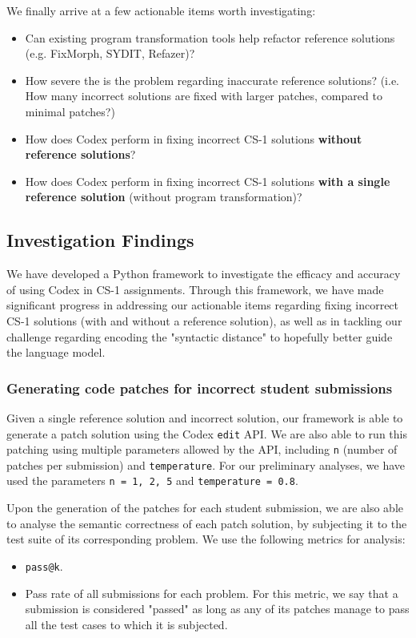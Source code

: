 We finally arrive at a few actionable items worth investigating:
\begin{itemize}
    \item Can existing program transformation tools help refactor reference solutions
          (e.g. FixMorph, SYDIT, Refazer)?
    \item How severe the is the problem regarding inaccurate reference solutions?
          (i.e. How many incorrect solutions are fixed with larger patches, compared
           to minimal patches?)
    \item How does Codex perform in fixing incorrect CS-1 solutions \textbf{without reference solutions}?
    \item How does Codex perform in fixing incorrect CS-1 solutions \textbf{with a single reference
          solution} (without program transformation)?
\end{itemize}

\subsection{Investigation Findings}

We have developed a Python framework to investigate the efficacy and accuracy of using Codex in
CS-1 assignments.
Through this framework, we have made significant progress in addressing our actionable items regarding
fixing incorrect CS-1 solutions (with and without a reference solution), as well as in tackling our
challenge regarding encoding the "syntactic distance" to hopefully better guide the language model.

\subsubsection{Generating code patches for incorrect student submissions}

Given a single reference solution and incorrect solution, our framework is able to generate a patch
solution using the Codex \texttt{edit} API. We are also able to run this patching using multiple
parameters allowed by the API, including \texttt{n} (number of patches per submission) and
\texttt{temperature}.
For our preliminary analyses, we have used the parameters \texttt{n = 1, 2, 5} and
\texttt{temperature = 0.8}.

Upon the generation of the patches for each student submission, we are also able to analyse the
semantic correctness of each patch solution, by subjecting it to the test suite of its corresponding
problem.
We use the following metrics for analysis:
\begin{itemize}
    \item \texttt{pass@k}.
    \item Pass rate of all submissions for each problem.
          For this metric, we say that a submission is considered "passed" as long as any of its
          patches manage to pass all the test cases to which it is subjected.
\end{itemize}

